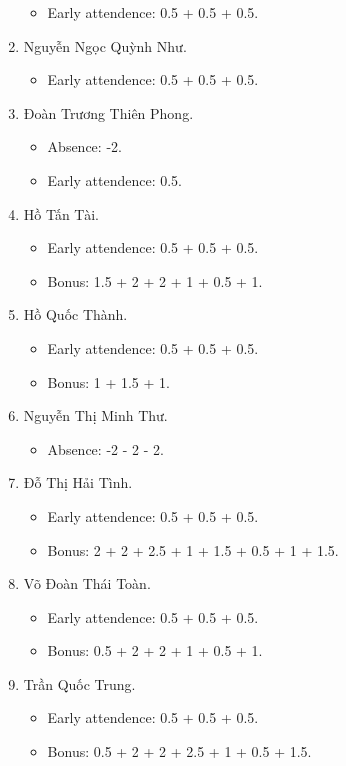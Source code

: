 \documentclass{article}
\begin{document}
\begin{enumerate}
	\begin{itemize}
		\item Early attendence: 0.5 + 0.5 + 0.5.
	\end{itemize}
	\item {\sc Nguyễn Ngọc Quỳnh Như.}
	\begin{itemize}
		\item Early attendence: 0.5 + 0.5 + 0.5.
	\end{itemize}
	\item {\sc Đoàn Trương Thiên Phong.}
	\begin{itemize}
		\item Absence: -2.
		\item Early attendence: 0.5.
	\end{itemize}
	\item {\sc Hồ Tấn Tài.}
	\begin{itemize}
		\item Early attendence: 0.5 + 0.5 + 0.5.
		\item Bonus: 1.5 + 2 + 2 + 1 + 0.5 + 1.
	\end{itemize}
	\item {\sc Hồ Quốc Thành.}
	\begin{itemize}
		\item Early attendence: 0.5 + 0.5 + 0.5.
		\item Bonus: 1 + 1.5 + 1.
	\end{itemize}
	\item {\sc Nguyễn Thị Minh Thư.}
	\begin{itemize}
		\item Absence: -2 - 2 - 2.
	\end{itemize}
	\item {\sc Đỗ Thị Hải Tình.}
	\begin{itemize}
		\item Early attendence: 0.5 + 0.5 + 0.5.
		\item Bonus: 2 + 2 + 2.5 + 1 + 1.5 + 0.5 + 1 + 1.5.
	\end{itemize}
	\item {\sc Võ Đoàn Thái Toàn.}
	\begin{itemize}
		\item Early attendence: 0.5 + 0.5 + 0.5.
		\item Bonus: 0.5 + 2 + 2 + 1 + 0.5 + 1.
	\end{itemize}
	\item {\sc Trần Quốc Trung.}
	\begin{itemize}
		\item Early attendence: 0.5 + 0.5 + 0.5.
		\item Bonus: 0.5 + 2 + 2 + 2.5 + 1 + 0.5 + 1.5.
	\end{itemize}
\end{enumerate}
\end{document}
